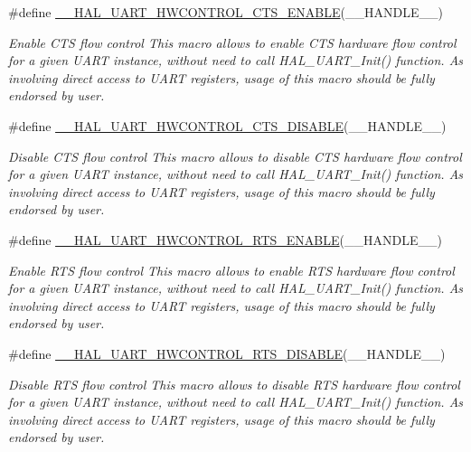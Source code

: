 \begin{DoxyCompactItemize}
\#define \hyperlink{group___u_a_r_t___exported___macros_ga4a77213945844bca4c22ba6a14b7ee4c}{\+\_\+\+\_\+\+H\+A\+L\+\_\+\+U\+A\+R\+T\+\_\+\+H\+W\+C\+O\+N\+T\+R\+O\+L\+\_\+\+C\+T\+S\+\_\+\+E\+N\+A\+B\+LE}(\+\_\+\+\_\+\+H\+A\+N\+D\+L\+E\+\_\+\+\_\+)
\begin{DoxyCompactList}\small\item\em Enable C\+TS flow control This macro allows to enable C\+TS hardware flow control for a given U\+A\+RT instance, without need to call H\+A\+L\+\_\+\+U\+A\+R\+T\+\_\+\+Init() function. As involving direct access to U\+A\+RT registers, usage of this macro should be fully endorsed by user. \end{DoxyCompactList}\item 
\#define \hyperlink{group___u_a_r_t___exported___macros_ga0a26cb3a576c2700f76a7c697c86a499}{\+\_\+\+\_\+\+H\+A\+L\+\_\+\+U\+A\+R\+T\+\_\+\+H\+W\+C\+O\+N\+T\+R\+O\+L\+\_\+\+C\+T\+S\+\_\+\+D\+I\+S\+A\+B\+LE}(\+\_\+\+\_\+\+H\+A\+N\+D\+L\+E\+\_\+\+\_\+)
\begin{DoxyCompactList}\small\item\em Disable C\+TS flow control This macro allows to disable C\+TS hardware flow control for a given U\+A\+RT instance, without need to call H\+A\+L\+\_\+\+U\+A\+R\+T\+\_\+\+Init() function. As involving direct access to U\+A\+RT registers, usage of this macro should be fully endorsed by user. \end{DoxyCompactList}\item 
\#define \hyperlink{group___u_a_r_t___exported___macros_ga017ec9001ff33136f87cc4034b2709a6}{\+\_\+\+\_\+\+H\+A\+L\+\_\+\+U\+A\+R\+T\+\_\+\+H\+W\+C\+O\+N\+T\+R\+O\+L\+\_\+\+R\+T\+S\+\_\+\+E\+N\+A\+B\+LE}(\+\_\+\+\_\+\+H\+A\+N\+D\+L\+E\+\_\+\+\_\+)
\begin{DoxyCompactList}\small\item\em Enable R\+TS flow control This macro allows to enable R\+TS hardware flow control for a given U\+A\+RT instance, without need to call H\+A\+L\+\_\+\+U\+A\+R\+T\+\_\+\+Init() function. As involving direct access to U\+A\+RT registers, usage of this macro should be fully endorsed by user. \end{DoxyCompactList}\item 
\#define \hyperlink{group___u_a_r_t___exported___macros_ga8c034e96ad8f263cafeb5898ff7311fd}{\+\_\+\+\_\+\+H\+A\+L\+\_\+\+U\+A\+R\+T\+\_\+\+H\+W\+C\+O\+N\+T\+R\+O\+L\+\_\+\+R\+T\+S\+\_\+\+D\+I\+S\+A\+B\+LE}(\+\_\+\+\_\+\+H\+A\+N\+D\+L\+E\+\_\+\+\_\+)
\begin{DoxyCompactList}\small\item\em Disable R\+TS flow control This macro allows to disable R\+TS hardware flow control for a given U\+A\+RT instance, without need to call H\+A\+L\+\_\+\+U\+A\+R\+T\+\_\+\+Init() function. As involving direct access to U\+A\+RT registers, usage of this macro should be fully endorsed by user. \end{DoxyCompactList}\item 

\end{DoxyCompactItemize}
